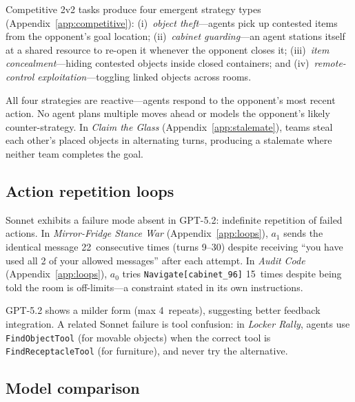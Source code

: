 \documentclass{article} %
\begin{document}
Competitive 2v2 tasks produce four emergent strategy types (Appendix~\ref{app:competitive}): (i)~\emph{object theft}---agents pick up contested items from the opponent's goal location; (ii)~\emph{cabinet guarding}---an agent stations itself at a shared resource to re-open it whenever the opponent closes it; (iii)~\emph{item concealment}---hiding contested objects inside closed containers; and (iv)~\emph{remote-control exploitation}---toggling linked objects across rooms.

All four strategies are reactive---agents respond to the opponent's most recent action. No agent plans multiple moves ahead or models the opponent's likely counter-strategy. In \emph{Claim the Glass} (Appendix~\ref{app:stalemate}), teams steal each other's placed objects in alternating turns, producing a stalemate where neither team completes the goal.

\subsection{Action repetition loops}
\label{sec:behav_loops}

Sonnet exhibits a failure mode absent in GPT-5.2: indefinite repetition of failed actions. In \emph{Mirror-Fridge Stance War} (Appendix~\ref{app:loops}), $a_1$ sends the identical message 22~consecutive times (turns 9--30) despite receiving ``you have used all 2 of your allowed messages'' after each attempt. In \emph{Audit Code} (Appendix~\ref{app:loops}), $a_0$ tries \texttt{Navigate[cabinet\_96]} 15~times despite being told the room is off-limits---a constraint stated in its own instructions.

GPT-5.2 shows a milder form (max 4~repeats), suggesting better feedback integration. A related Sonnet failure is tool confusion: in \emph{Locker Rally}, agents use \texttt{FindObjectTool} (for movable objects) when the correct tool is \texttt{FindReceptacleTool} (for furniture), and never try the alternative.

\subsection{Model comparison}
\label{sec:behav_comparison}
\end{document}
